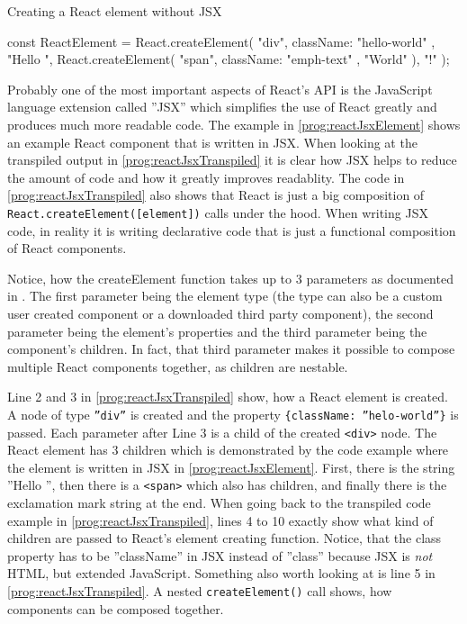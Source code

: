 \begin{program}
\caption{Creating a React element without JSX} 
\label{prog:reactJsxTranspiled}
\begin{JsCode}
const ReactElement = React.createElement(
  "div", 
  { className: "hello-world" }, 
  "Hello ", 
  React.createElement(
    "span", 
    { className: "emph-text" }, 
    "World"
  ), 
  "!"
);
\end{JsCode}
\end{program}

Probably one of the most important aspects of React's API is the JavaScript language extension called ''JSX'' which simplifies the use of React greatly and produces much more readable code. The example in \ref{prog:reactJsxElement} shows an example React component that is written in JSX. When looking at the transpiled output in \ref{prog:reactJsxTranspiled} it is clear how JSX helps to reduce the amount of code and how it greatly improves readablity. The code in \ref{prog:reactJsxTranspiled} also shows that React is just a big composition of \texttt{React.createElement([element])} calls under the hood. When writing JSX code, in reality it is writing declarative code that is just a functional composition of React components. 

Notice, how the createElement function takes up to 3 parameters as documented in \cite[/docs/react-api.html]{React}. The first parameter being the element type (the type can also be a custom user created component or a downloaded third party component), the second parameter being the element's properties and the third parameter being the component's children. In fact, that third parameter makes it possible to compose multiple React components together, as children are nestable. 

Line 2 and 3 in \ref{prog:reactJsxTranspiled} show, how a React element is created. A node of type \texttt{''div''} is created and the property \texttt{\{className: ''helo-world''\}} is passed. Each parameter after Line 3 is a child of the created \texttt{<div>} node. The React element has 3 children which is demonstrated by the code example where the element is written in JSX in \ref{prog:reactJsxElement}. First, there is the string ''Hello '', then there is a \texttt{<span>} which also has children, and finally there is the exclamation mark string at the end. When going back to the transpiled code example in \ref{prog:reactJsxTranspiled}, lines 4 to 10 exactly show what kind of children are passed to React's element creating function. Notice, that the class property has to be ''className'' in JSX instead of ''class'' because JSX is \emph{not} HTML, but extended JavaScript. Something also worth looking at is line 5 in \ref{prog:reactJsxTranspiled}. A nested \texttt{createElement()} call shows, how components can be composed together.

